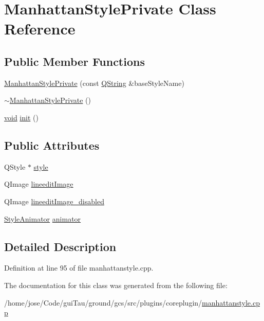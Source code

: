 \hypertarget{class_manhattan_style_private}{\section{Manhattan\-Style\-Private Class Reference}
\label{class_manhattan_style_private}
}
\subsection*{Public Member Functions}
\begin{DoxyCompactItemize}
\item 
\hyperlink{group___core_plugin_gaa6c99cfeba9a6ca806dd80e4930ef4b2}{Manhattan\-Style\-Private} (const \hyperlink{group___u_a_v_objects_plugin_gab9d252f49c333c94a72f97ce3105a32d}{Q\-String} \&base\-Style\-Name)
\item 
\hyperlink{group___core_plugin_gafa95005067f1109eeb85e1932a592104}{$\sim$\-Manhattan\-Style\-Private} ()
\item 
\hyperlink{group___u_a_v_objects_plugin_ga444cf2ff3f0ecbe028adce838d373f5c}{void} \hyperlink{group___core_plugin_ga33bd5752098c4000975e3d2ec2b1714d}{init} ()
\end{DoxyCompactItemize}
\subsection*{Public Attributes}
\begin{DoxyCompactItemize}
\item 
Q\-Style $\ast$ \hyperlink{group___core_plugin_ga592a11bdeaf57b9f1254f83e895c2c4a}{style}
\item 
Q\-Image \hyperlink{group___core_plugin_ga3afdf7e9c4d6004b467dee3f941439ed}{lineedit\-Image}
\item 
Q\-Image \hyperlink{group___core_plugin_ga3fd36c3c8443ddd74203de9f20e0e404}{lineedit\-Image\-\_\-disabled}
\item 
\hyperlink{class_style_animator}{Style\-Animator} \hyperlink{group___core_plugin_gaeb6b3907adb0abaf3c983940d0fb6fea}{animator}
\end{DoxyCompactItemize}


\subsection{Detailed Description}


Definition at line 95 of file manhattanstyle.\-cpp.



The documentation for this class was generated from the following file\-:\begin{DoxyCompactItemize}
\item 
/home/jose/\-Code/gui\-Tau/ground/gcs/src/plugins/coreplugin/\hyperlink{manhattanstyle_8cpp}{manhattanstyle.\-cpp}\end{DoxyCompactItemize}
